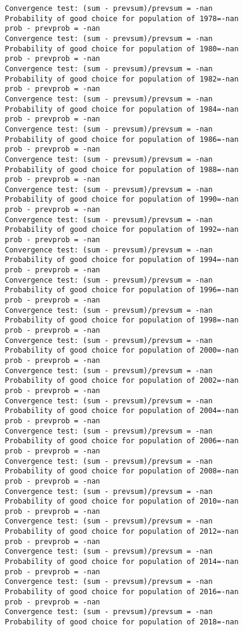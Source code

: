 \documentclass[11pt,onecolumn]{article}
\begin{document}
\begin{verbatim}
Convergence test: (sum - prevsum)/prevsum = -nan
Probability of good choice for population of 1978=-nan
prob - prevprob = -nan
Convergence test: (sum - prevsum)/prevsum = -nan
Probability of good choice for population of 1980=-nan
prob - prevprob = -nan
Convergence test: (sum - prevsum)/prevsum = -nan
Probability of good choice for population of 1982=-nan
prob - prevprob = -nan
Convergence test: (sum - prevsum)/prevsum = -nan
Probability of good choice for population of 1984=-nan
prob - prevprob = -nan
Convergence test: (sum - prevsum)/prevsum = -nan
Probability of good choice for population of 1986=-nan
prob - prevprob = -nan
Convergence test: (sum - prevsum)/prevsum = -nan
Probability of good choice for population of 1988=-nan
prob - prevprob = -nan
Convergence test: (sum - prevsum)/prevsum = -nan
Probability of good choice for population of 1990=-nan
prob - prevprob = -nan
Convergence test: (sum - prevsum)/prevsum = -nan
Probability of good choice for population of 1992=-nan
prob - prevprob = -nan
Convergence test: (sum - prevsum)/prevsum = -nan
Probability of good choice for population of 1994=-nan
prob - prevprob = -nan
Convergence test: (sum - prevsum)/prevsum = -nan
Probability of good choice for population of 1996=-nan
prob - prevprob = -nan
Convergence test: (sum - prevsum)/prevsum = -nan
Probability of good choice for population of 1998=-nan
prob - prevprob = -nan
Convergence test: (sum - prevsum)/prevsum = -nan
Probability of good choice for population of 2000=-nan
prob - prevprob = -nan
Convergence test: (sum - prevsum)/prevsum = -nan
Probability of good choice for population of 2002=-nan
prob - prevprob = -nan
Convergence test: (sum - prevsum)/prevsum = -nan
Probability of good choice for population of 2004=-nan
prob - prevprob = -nan
Convergence test: (sum - prevsum)/prevsum = -nan
Probability of good choice for population of 2006=-nan
prob - prevprob = -nan
Convergence test: (sum - prevsum)/prevsum = -nan
Probability of good choice for population of 2008=-nan
prob - prevprob = -nan
Convergence test: (sum - prevsum)/prevsum = -nan
Probability of good choice for population of 2010=-nan
prob - prevprob = -nan
Convergence test: (sum - prevsum)/prevsum = -nan
Probability of good choice for population of 2012=-nan
prob - prevprob = -nan
Convergence test: (sum - prevsum)/prevsum = -nan
Probability of good choice for population of 2014=-nan
prob - prevprob = -nan
Convergence test: (sum - prevsum)/prevsum = -nan
Probability of good choice for population of 2016=-nan
prob - prevprob = -nan
Convergence test: (sum - prevsum)/prevsum = -nan
Probability of good choice for population of 2018=-nan

\end{verbatim}
\end{document}
